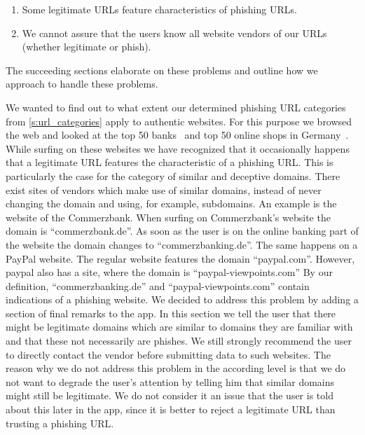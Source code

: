 \begin{enumerate}
	\item Some legitimate URLs feature characteristics of phishing URLs.
	\item We cannot assure that the users know all website vendors of our URLs (whether legitimate or phish).
\end{enumerate}

The succeeding sections elaborate on these problems and outline how we approach to handle these problems.
\begin{description}[leftmargin=0cm]
	\item[Legitimate but Fraudulent Looking URLs] 
We wanted to find out to what extent our determined phishing URL categories from \autoref{s:url_categories} apply to authentic websites.
For this purpose we browsed the web and looked at the top 50 banks~\cite{bankrank} and top 50 online shops in Germany~\cite{onlineshoprank}. 
While surfing on these websites we have recognized that it occasionally happens that a legitimate URL features the characteristic of a phishing URL. 
This is particularly the case for the category of similar and deceptive domains. 
There exist sites of vendors which make use of similar domains, instead of never changing the domain and using, for example, subdomains. 
An example is the website of the Commerzbank. 
When surfing on Commerzbank's website the domain is ``commerzbank.de''. 
As soon as the user is on the online banking part of the website the domain changes to ``commerzbanking.de''. 
The same happens on a PayPal website. 
The regular website features the domain ``paypal.com''.
However, paypal also has a site, where the domain is ``paypal-viewpoints.com''
By our definition, ``commerzbanking.de'' and  ``paypal-viewpoints.com'' contain indications of a phishing website.
We decided to address this problem by adding a section of final remarks to the app. 
In this section we tell the user that there might be legitimate domains which are similar to domains they are familiar with and that these not necessarily are phishes. 
We still strongly recommend the user to directly contact the vendor before submitting data to such websites. 
The reason why we do not address this problem in the according level is that we do not want to degrade the user's attention by telling him that similar domains might still be legitimate. 
We do not consider it an issue that the user is told about this later in the app, since it is better to reject a legitimate URL than trusting a phishing URL. 


\end{description}
